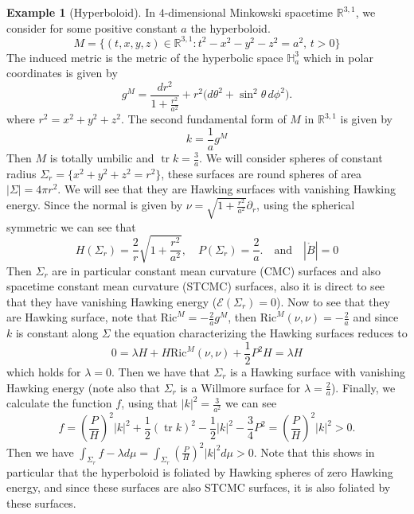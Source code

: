 \documentclass[12pt,a4paper]{amsart}
\theoremstyle{plain}
\theoremstyle{definition}
\newtheorem{example}[theorem]{Example}
\newcommand{\tr}{\operatorname{tr}}
\begin{document}
\begin{example}[Hyperboloid]\label{example1}
    In $4$-dimensional Minkowski spacetime  \( \mathbb{R}^{3,1} \), we consider for some positive  constant $a$ the hyperboloid.
$$M=\{(t,x,y,z) \in \mathbb{R}^{3,1} : t^2-x^2-y^2-z^2 =a^2,\, t>0\} $$
The induced metric is the metric of the hyperbolic space $\mathbb{H}^3_{a}$ which in polar coordinates is given by 
\begin{equation}
    g^M = \frac{dr^2}{1 + \frac{r^2}{a^2}}
+
r^2 \bigl(d\theta^2 + \sin^2\!\theta\,d\phi^2\bigr).
\end{equation}
where $r^2=x^2+y^2+z^2$.  The second fundamental form of $M$ in $\mathbb{R}^{3,1} $ is given by 
\begin{equation}
    k=\frac{1}{a} g^M
\end{equation}
    Then $M$ is totally umbilic and  $\tr k = \frac{3}{a}$. We will consider spheres of constant radius $\Sigma_r= \{x^2+y^2+z^2=r^2 \}$, these surfaces are round spheres of area $|\Sigma|=4\pi r^2$. We will see that they are Hawking surfaces with vanishing Hawking energy. Since the normal is given by $\nu = \sqrt{1 +\frac{r^2}{a^2}} \partial_r$, using the spherical symmetric we can see that 
\begin{equation}
    H(\Sigma_r)= \frac{2}{r} \sqrt{1 +\frac{r^2}{a^2}},  \quad P(\Sigma_r)= \frac{2}{a}. \quad \text{and} \quad  |\mathring{B}|=0
\end{equation}
Then $\Sigma_r$ are in particular constant mean curvature (CMC) surfaces and also spacetime constant mean curvature (STCMC) surfaces, also it is direct to see that they have vanishing Hawking energy ($\mathcal{E}(\Sigma_r)=0$).  Now to see that they are Hawking surface, note that $\mathrm{Ric}^M= -\frac{2}{a} g^M$, then  $\mathrm{Ric}^M(\nu, \nu)=-\frac{2}{a} $ and since $k$ is constant along $\Sigma$ the equation characterizing the Hawking surfaces reduces to 
\begin{equation}
 0=  \lambda H+ H\mathrm{Ric}^M(\nu, \nu) + \frac{1}{2}P^2H =\lambda H
\end{equation}
which holds for $\lambda=0$. Then we have that $\Sigma_r$ is a Hawking surface with vanishing Hawking energy (note also that $\Sigma_r$ is a Willmore surface for $\lambda= \frac{2}{a}$). Finally, we calculate the function $f$, using that $|k|^2= \frac{3}{a^2}$ we can see 
\begin{equation}
    f= \left( \frac{P}{H}\right)^2|k|^2+ \frac{1}{2 }(\tr k)^2  - \frac{1}{2}|k|^2  - \frac{3}{4} P^2= \left( \frac{P}{H}\right)^2|k|^2 >0. 
\end{equation}
Then we have $\int_{\Sigma_r} f-\lambda d\mu= \int_{\Sigma_r} \left( \frac{P}{H}\right)^2|k|^2 d\mu >0 $. Note  that this shows in particular that the hyperboloid is foliated by Hawking spheres of zero Hawking energy, and since these surfaces are also STCMC surfaces, it is also foliated by these surfaces. 
\end{example}
\end{document}
